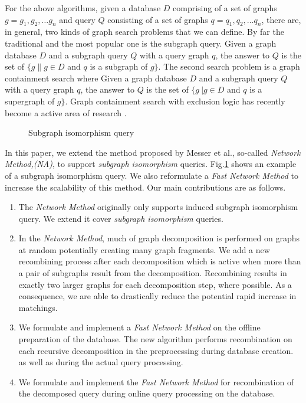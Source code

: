 For the above algorithms, given a database $D$ comprising of a set of graphs $g=g_1 ,g_2 ,\ldots g_n$ and query $Q$ consisting of a set of graphs 
$q=q_1 ,q_2 ,\ldots q_n$, there are, in general, two kinds of graph search problems that we can define. By far the traditional and the most popular 
one is the subgraph query. Given a graph database $D$ and a subgraph query $Q$ with  a query graph $q$, the answer to $Q$ is the set of $\{g \| g\in D$ 
and $q$ is a subgraph of $g\} $. The second search problem is a graph containment search where Given a graph database $D$ and a subgraph query $Q$ with  
a query graph $q$, the answer to $Q$ is the set of $\{g\ | g\in D$ and $q$ is a supergraph of $g\}$. Graph containment search with exclusion logic has 
recently become a  active area of research \cite{chen2007_cindex} \cite{zhang_gao_wu2011}.  
 

\begin{figure}
\centering

\caption{Subgraph isomorphism query}
\label{fig:fig11}
\end{figure}


In this paper, we extend the method proposed by Messer et al.\cite{messmer_bunke2000}, so-called \textit{Network Method,(NA)}, to support \textit{subgraph isomorphism} queries.
Fig.\ref{fig:fig11} shows an example of a subgraph isomorphism query. We also reformulate a  \textit{Fast Network Method } to increase the scalability of this method.
Our main contributions are as follows.

\begin{enumerate}
\item The \textit{Network Method} originally only supports induced subgraph isomorphism query. We extend it  cover \textit{subgraph isomorphism} queries.
\item  In the \textit{Network Method}, much of graph decomposition is performed on graphs at random potentially creating many graph fragments. We add a new recombining 
process after each decomposition which is active when more than a pair of  subgraphs result from the decomposition.  Recombining results in exactly  two larger 
graphs for each decomposition step, where possible.  As a consequence, we are able to drastically reduce the potential rapid increase in matchings. 
\item We formulate and implement  a  \textit{Fast Network Method} on the offline preparation of the database. The new algorithm performs recombination 
on  each recursive decomposition in the  preprocessing during database creation. as well as during the actual query processing. 
\item We formulate and implement the \textit{Fast Network Method} for recombination of the decomposed query during  online query processing on the database.
\end{enumerate}

